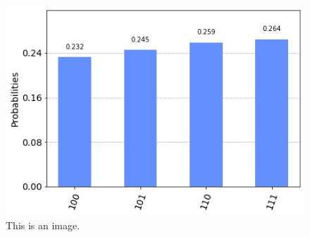 \documentclass{book}
\begin{document}
\begin{center}
	\begin{figure}[htbp]
		\centering
		\includegraphics[width=0.9\linewidth]{Teleport7.png}
		\caption{This is an image.}
	\end{figure}
\end{center}
{ \hspace*{\fill} \\}


\begin{tcolorbox}
	\begin{Verbatim}[commandchars=\\\{\}]
		
	\end{Verbatim}
\end{tcolorbox}





\newpage
	
	
	
\end{document}
